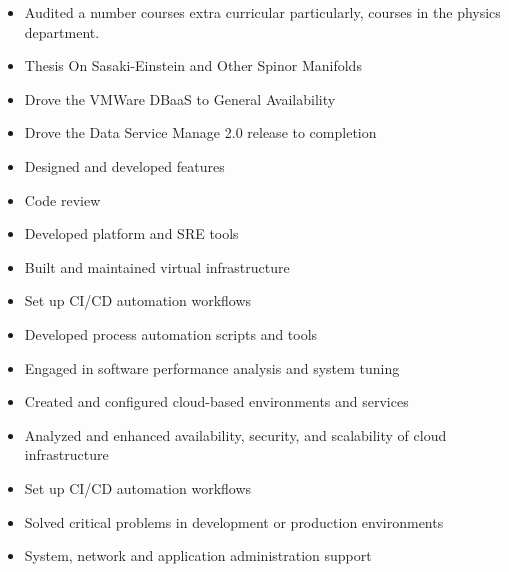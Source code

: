 \documentclass[10pt,a4paper,ragged2e,withhyper]{altacv}
\begin{document}


\makecvheader


\begin{itemize}
\item Audited a number courses extra curricular particularly, courses in the physics department.
\end{itemize}

\begin{itemize}
\item Thesis On Sasaki-Einstein and Other Spinor Manifolds
\end{itemize}
\divider


\bigskip
{}

\begin{itemize}
\item Drove the VMWare DBaaS to General Availability
\item Drove the Data Service Manage 2.0 release to completion
\item Designed and developed features
\item Code review
\item Developed platform and SRE tools
\item Built and maintained virtual infrastructure
\item Set up CI/CD automation workflows
\end{itemize}
\divider

\begin{itemize}
\item Developed process automation scripts and tools
\item Engaged in software performance analysis and system tuning
\item Created and configured cloud-based environments and services
\item Analyzed and enhanced availability, security, and scalability of cloud infrastructure
\item Set up CI/CD automation workflows
\item Solved critical problems in development or production environments
\item System, network and application administration support
\end{itemize}
\divider
\end{document}
